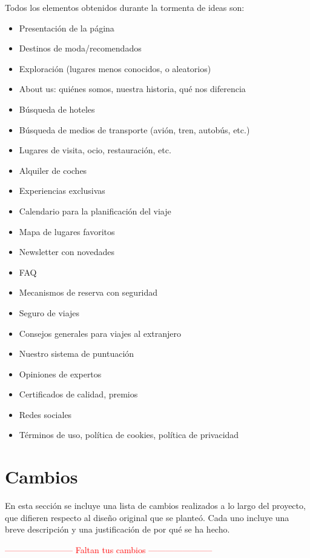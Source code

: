 \documentclass[11pt, a4paper]{book}
\begin{document}
	Todos los elementos obtenidos durante la tormenta de ideas son:
	
	\begin{itemize}
		\item Presentación de la página
		\item Destinos de moda/recomendados
		\item Exploración (lugares menos conocidos, o aleatorios)
		\item About us: quiénes somos, nuestra historia, qué nos diferencia
		\item Búsqueda de hoteles
		\item Búsqueda de medios de transporte (avión, tren, autobús, etc.)
		\item Lugares de visita, ocio, restauración, etc.
		\item Alquiler de coches
		\item Experiencias exclusivas
		\item Calendario para la planificación del viaje
		\item Mapa de lugares favoritos
		\item Newsletter con novedades
		\item FAQ
		\item Mecanismos de reserva con seguridad
		\item Seguro de viajes
		\item Consejos generales para viajes al extranjero
		\item Nuestro sistema de puntuación
		\item Opiniones de expertos
		\item Certificados de calidad, premios
		\item Redes sociales
		\item Términos de uso, política de cookies, política de privacidad
	\end{itemize}


	\section{Cambios}
	\label{sect:anexo2}
	En esta sección se incluye una lista de cambios realizados a lo largo del proyecto, que difieren respecto al diseño original que se planteó. Cada uno incluye una breve descripción y una justificación de por qué se ha hecho.
	
	\begin{Huge}
		\textcolor{red}{------------------------ Faltan tus cambios -----------------------}
	\end{Huge}
	
\end{document}
